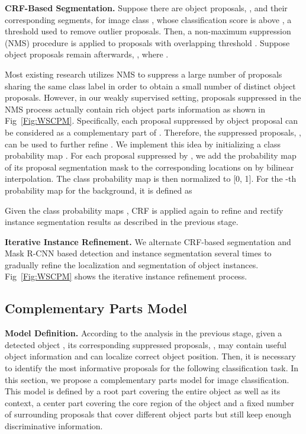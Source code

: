 \documentclass[10pt,twocolumn,letterpaper]{article}
\begin{document}
\noindent\textbf{CRF-Based Segmentation.}
Suppose there are  object proposals, , and their corresponding segments,  for image class , whose classification score is above , a threshold used to remove outlier proposals. Then, a non-maximum suppression (NMS) procedure is applied to  proposals with overlapping threshold . Suppose  object proposals remain afterwards, , where .

Most existing research utilizes NMS to suppress a large number of proposals sharing the same class label in order to obtain a small number of distinct object proposals. However, in our weakly supervised setting, proposals suppressed in the NMS process actually contain rich object parts information as shown in Fig~\ref{Fig:WSCPM}. Specifically, each proposal  suppressed by object proposal  can be considered as a complementary part of . Therefore, the suppressed proposals, , can be used to further refine . We implement this idea by initializing a class probability map . For each proposal  suppressed by , we add the probability map of its proposal segmentation mask  to the corresponding locations on  by bilinear interpolation. The class probability map is then normalized to [0, 1]. For the -th probability map for the background, it is defined as
    

Given the class probability maps , CRF is applied again to refine and rectify instance segmentation results as described in the previous stage.

\noindent\textbf{Iterative Instance Refinement.} We alternate CRF-based segmentation and Mask R-CNN based detection and instance segmentation several times to gradually refine the localization and segmentation of object instances. Fig~\ref{Fig:WSCPM} shows the iterative instance refinement process.

\subsection{Complementary Parts Model}

\noindent\textbf{Model Definition.}
According to the analysis in the previous stage, given a detected object , its corresponding suppressed proposals, , may contain useful object information and can localize correct object position. Then, it is necessary to identify the most informative proposals for the following classification task. In this section, we propose a complementary parts model  for image classification. This model is defined by a root part covering the entire object as well as its context, a center part covering the core region of the object and a fixed number of surrounding proposals that cover different object parts but still keep enough discriminative information.
\end{document}
